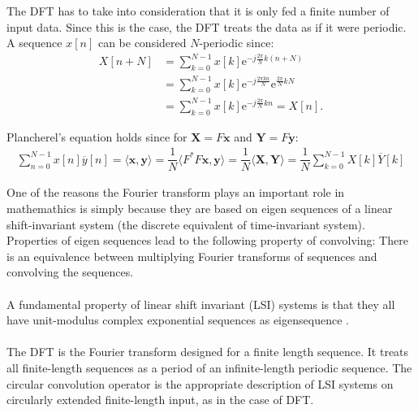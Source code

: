 The DFT has to take into consideration that it is only fed a finite number of input data. Since this is the case, the DFT treats the data as if it were periodic. A sequence $x[n]$ can be considered $N$-periodic since:
\begin{align*}
	X[n+N]
	&= \sum_{k=0}^{N-1} x[k] \text{e}^{-j \frac{2 \pi}{N}  k (n		+N)} \\
	&= \sum_{k=0}^{N-1} x[k] \text{e}^{-j \frac{2 \pi k n}{N}}		\text{e}^{\frac{2 \pi}{N} kN} \\
	&= \sum_{k=0}^{N-1} x[k] \text{e}^{-j \frac{2 \pi}{N} k n} 		= X[n].
\end{align*}

Plancherel's equation holds since for $\textbf{X} = F\textbf{x}$ and $\textbf{Y} = F\textbf{y}$:
\begin{align*}
\sum_{n=0}^{N-1} x[n] \overline{y}[n] = \langle \textbf{x},\textbf{y} \rangle = \dfrac{1}{N} \langle F^*F\textbf{x},\textbf{y} \rangle = \dfrac{1}{N} \langle \textbf{X},\textbf{Y} \rangle = \dfrac{1}{N} \sum_{k=0}^{N-1} X[k] \overline{Y}[k]
\end{align*}

One of the reasons the Fourier transform plays an important role in mathemathics is simply because they are based on eigen sequences of a linear shift-invariant system (the discrete equivalent of time-invariant system).
Properties of eigen sequences lead to the following property of convolving:
There is an equivalence between multiplying Fourier transforms of sequences and convolving the sequences.
\\ \\
A fundamental property of linear shift invariant (LSI) systems is that they all have unit-modulus complex exponential sequences as eigensequence \cite{FSP} .
\\ \\
The DFT is the Fourier transform designed for a finite length sequence.
It treats all finite-length sequences as a period of an infinite-length periodic sequence.
The circular convolution operator is the appropriate description of LSI systems on circularly extended finite-length input, as in the case of DFT. 

